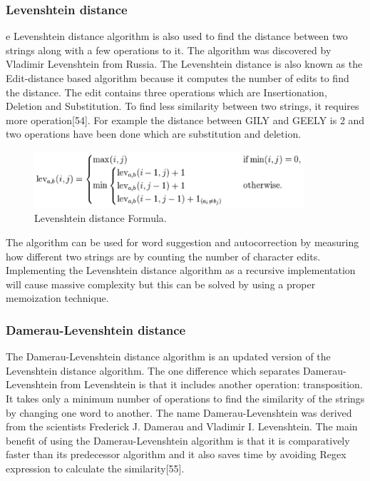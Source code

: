 \subsubsection{Levenshtein distance}
e Levenshtein distance algorithm is also used to find the distance between two strings along with a few operations to it. The algorithm was discovered by Vladimir Levenshtein from Russia. The Levenshtein distance is also known as the Edit-distance based algorithm because it computes the number of edits to find the distance. The edit contains three operations which are Insertionation, Deletion and Substitution. To find less similarity between two strings, it requires more operation[54]. For example the distance between GILY and GEELY is 2 and two operations have been done which are substitution and deletion.

\begin{figure}[h!]
	\includegraphics[width=10cm]{includes/levdist.png}
	\centering
	\caption{ Levenshtein distance Formula.}
	\label{fig:levdist}
\end{figure}
The algorithm can be used for word suggestion and autocorrection by measuring how different two strings are by counting the number of character edits. Implementing the Levenshtein distance algorithm as a recursive implementation will cause massive complexity but this can be solved by using a proper memoization technique.

\subsubsection{Damerau-Levenshtein distance}
The Damerau-Levenshtein distance algorithm is an updated version of the Levenshtein distance algorithm. The one difference which separates  Damerau-Levenshtein from Levenshtein is that it includes another operation: transposition. It takes only a minimum number of operations to find the similarity of the strings by changing one word to another. The name Damerau-Levenshtein was derived from the scientists Frederick J. Damerau and Vladimir I. Levenshtein. The main benefit of using the Damerau-Levenshtein algorithm is that it is comparatively faster than its predecessor algorithm and it also saves time by avoiding Regex expression to calculate the similarity[55]. 

